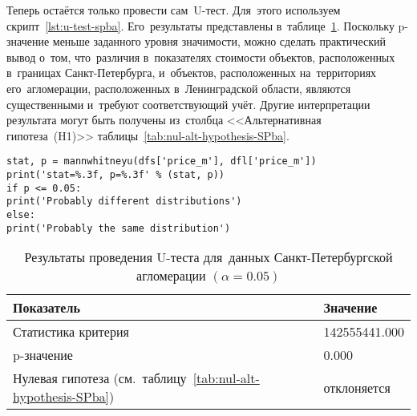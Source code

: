 \documentclass[]{scrartcl}
\begin{document}
Теперь остаётся только провести сам~U-тест. Для~этого используем скрипт~\ref{lst:u-test-spba}. Его~результаты представлены в~таблице~\ref{tab:u-test-py-result}. Поскольку p-значение меньше заданного уровня значимости, можно сделать практический вывод о~том, что~различия в~показателях стоимости объектов, расположенных в~границах Санкт-Петербурга, и~объектов, расположенных на~территориях его~агломерации, расположенных в~Ленинградской области, являются существенными и~требуют соответствующий учёт. Другие интерпретации результата могут быть получены из~столбца <<Альтернативная гипотеза~(H1)>> таблицы~\ref{tab:nul-alt-hypothesis-SPba}.
%
\begin{lstlisting}[float, caption = Проведение теста Манна"--~Уитни-Уилкоксона для~данных удельных цен предложения квартир в~агломерации Санкт-Петербурга, firstnumber=1, label= lst:u-test-spba]
stat, p = mannwhitneyu(dfs['price_m'], dfl['price_m'])
print('stat=%.3f, p=%.3f' % (stat, p))
if p <= 0.05:
print('Probably different distributions')
else:
print('Probably the same distribution')
\end{lstlisting}  
%
\begin{table}[ht]
	\caption{Результаты проведения U-теста для~данных Санкт-Петербургской агломерации $({\textstyle \alpha=0.05})$}\label{tab:u-test-py-result}
	\centering
	\begin{tabular}{ll}
		\hline
	Показатель&Значение\\
		\hline
	Статистика критерия&142555441.000\\
		\hline
	p-значение&0.000\\
		\hline
	Нулевая гипотеза (см.~таблицу~\ref{tab:nul-alt-hypothesis-SPba})&отклоняется\\
		\hline
	\end{tabular}
\end{table}

\clearpage
\end{document}
